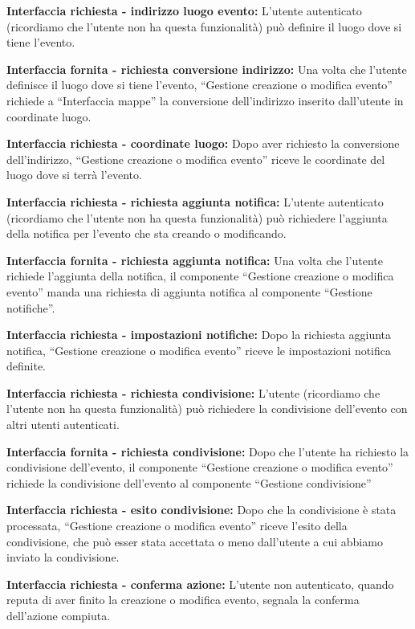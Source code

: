 \begin{listaPersonale}[]{}
    \textbf{Interfaccia richiesta - indirizzo luogo evento:} L'utente autenticato (ricordiamo che l'utente non ha questa funzionalità) può definire il luogo dove si tiene l'evento.

    \textbf{Interfaccia fornita - richiesta conversione indirizzo:} Una volta che l'utente definisce il luogo dove si tiene l'evento, “Gestione creazione o modifica evento” richiede a “Interfaccia mappe” la conversione dell'indirizzo inserito dall'utente in coordinate luogo.

    \textbf{Interfaccia richiesta - coordinate luogo:} Dopo aver richiesto la conversione dell'indirizzo, “Gestione creazione o modifica evento” riceve le coordinate del luogo dove si terrà l'evento.

    \textbf{Interfaccia richiesta - richiesta aggiunta notifica:} L'utente autenticato (ricordiamo che l'utente non ha questa funzionalità)  può richiedere l'aggiunta della notifica per l'evento che sta creando o modificando.

    \textbf{Interfaccia fornita - richiesta aggiunta notifica:} Una volta che l'utente richiede l'aggiunta della notifica, il componente “Gestione creazione o modifica evento” manda una richiesta di aggiunta notifica al componente “Gestione notifiche”.

    \textbf{Interfaccia richiesta - impostazioni notifiche:} Dopo la richiesta aggiunta notifica, “Gestione creazione o modifica evento” riceve le impostazioni notifica definite.

    \textbf{Interfaccia richiesta - richiesta condivisione:} L'utente (ricordiamo che l'utente non ha questa funzionalità) può richiedere la condivisione dell'evento con altri utenti autenticati.

    \textbf{Interfaccia fornita - richiesta condivisione:} Dopo che l'utente ha richiesto la condivisione dell'evento, il componente “Gestione creazione o modifica evento” richiede la condivisione dell'evento al componente “Gestione condivisione”

    \textbf{Interfaccia richiesta - esito condivisione:} Dopo che la condivisione è stata processata, “Gestione creazione o modifica evento” riceve l'esito della condivisione, che può esser stata accettata o meno dall'utente a cui abbiamo inviato la condivisione.

    \textbf{Interfaccia richiesta - conferma azione:} L'utente non autenticato, quando reputa di aver finito la creazione o modifica evento, segnala la conferma dell'azione compiuta.


\end{listaPersonale}
